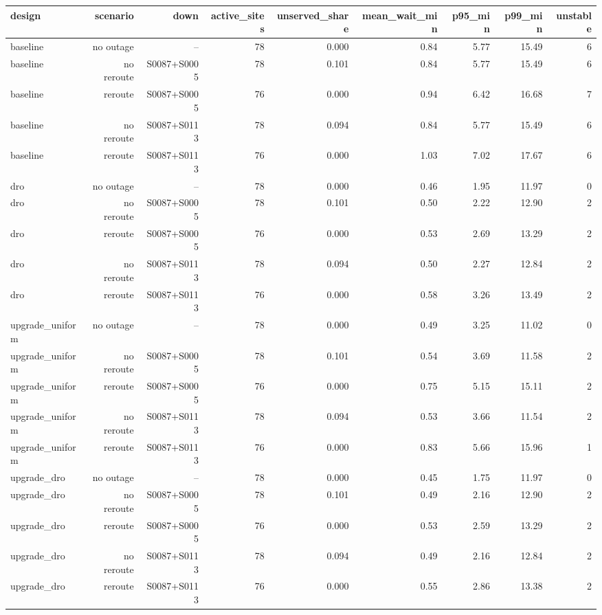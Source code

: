 \begin{tabular}{lrrrrrrrr}
\toprule
design & scenario & down & active\_sites & unserved\_share & mean\_wait\_min & p95\_min & p99\_min & unstable \\
\midrule
baseline & no outage & -- & 78 & 0.000 & 0.84 & 5.77 & 15.49 & 6 \\
baseline & no reroute & S0087+S0005 & 78 & 0.101 & 0.84 & 5.77 & 15.49 & 6 \\
baseline & reroute & S0087+S0005 & 76 & 0.000 & 0.94 & 6.42 & 16.68 & 7 \\
baseline & no reroute & S0087+S0113 & 78 & 0.094 & 0.84 & 5.77 & 15.49 & 6 \\
baseline & reroute & S0087+S0113 & 76 & 0.000 & 1.03 & 7.02 & 17.67 & 6 \\
dro & no outage & -- & 78 & 0.000 & 0.46 & 1.95 & 11.97 & 0 \\
dro & no reroute & S0087+S0005 & 78 & 0.101 & 0.50 & 2.22 & 12.90 & 2 \\
dro & reroute & S0087+S0005 & 76 & 0.000 & 0.53 & 2.69 & 13.29 & 2 \\
dro & no reroute & S0087+S0113 & 78 & 0.094 & 0.50 & 2.27 & 12.84 & 2 \\
dro & reroute & S0087+S0113 & 76 & 0.000 & 0.58 & 3.26 & 13.49 & 2 \\
upgrade\_uniform & no outage & -- & 78 & 0.000 & 0.49 & 3.25 & 11.02 & 0 \\
upgrade\_uniform & no reroute & S0087+S0005 & 78 & 0.101 & 0.54 & 3.69 & 11.58 & 2 \\
upgrade\_uniform & reroute & S0087+S0005 & 76 & 0.000 & 0.75 & 5.15 & 15.11 & 2 \\
upgrade\_uniform & no reroute & S0087+S0113 & 78 & 0.094 & 0.53 & 3.66 & 11.54 & 2 \\
upgrade\_uniform & reroute & S0087+S0113 & 76 & 0.000 & 0.83 & 5.66 & 15.96 & 1 \\
upgrade\_dro & no outage & -- & 78 & 0.000 & 0.45 & 1.75 & 11.97 & 0 \\
upgrade\_dro & no reroute & S0087+S0005 & 78 & 0.101 & 0.49 & 2.16 & 12.90 & 2 \\
upgrade\_dro & reroute & S0087+S0005 & 76 & 0.000 & 0.53 & 2.59 & 13.29 & 2 \\
upgrade\_dro & no reroute & S0087+S0113 & 78 & 0.094 & 0.49 & 2.16 & 12.84 & 2 \\
upgrade\_dro & reroute & S0087+S0113 & 76 & 0.000 & 0.55 & 2.86 & 13.38 & 2 \\
\bottomrule
\end{tabular}
